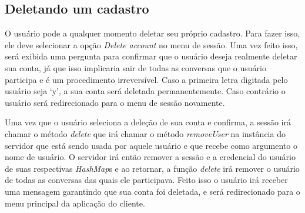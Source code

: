 \documentclass[../main.tex]{subfiles}
\begin{document}
\subsection{Deletando um cadastro}

O usuário pode a qualquer momento deletar seu próprio cadastro.
Para fazer isso, ele deve selecionar a opção \textit{Delete account} no menu de sessão.
Uma vez feito isso, será exibida uma pergunta para confirmar que o usuário deseja realmente deletar sua conta, já que isso implicaria sair de todas as conversas que o usuário participa e é um procedimento irreversível.
Caso a primeira letra digitada pelo usuário seja `y', a sua conta será deletada permanentemente.
Caso contrário o usuário será redirecionado para o menu de sessão novamente.

Uma vez que o usuário seleciona a deleção de sua conta e confirma, a sessão irá chamar o método \textit{delete} que irá chamar o método \textit{removeUser} na instância do servidor que está sendo usada por aquele usuário e que recebe como argumento o nome de usuário.
O servidor irá então remover a sessão e a credencial do usuário de suas respectivas \textit{HashMap}s e ao retornar, a função \textit{delete} irá remover o usuário de todas as conversas das quais ele participava.
Feito isso o usuário irá receber uma mensagem garantindo que sua conta foi deletada, e será redirecionado para o menu principal da aplicação do cliente.
\end{document}
